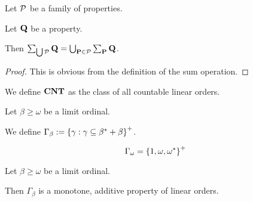 \begin{lemma}
  Let $\mathcal{P}$ be a family of properties.

  Let $\mathbf{Q}$ be a property.

  Then $\sum_{\bigcup \mathcal{P}}{\mathbf{Q}} = \bigcup_{\mathbf{P} \in \mathcal{P}}{\sum_{\mathbf{P}}{\mathbf{Q}}}$.
\end{lemma}

\begin{proof}
  This is obvious from the definition of the sum operation.
\end{proof}

\begin{definition}
  We define $\mathbf{CNT}$ as the class of all countable linear orders.
\end{definition}


\begin{definition}
  Let $\beta \ge \omega$ be a limit ordinal.

  We define $\Gamma_{\beta} := \left\{ {\gamma : \gamma \subseteq \beta^\ast + \beta} \right\}^+$.
\end{definition}

\begin{example}
  \[
    \Gamma_{\omega} = \left\{ {1, \omega, \omega^\ast} \right\}^+
  \]
\end{example}

\begin{observation}
  Let $\beta \ge \omega$ be a limit ordinal.

  Then $\Gamma_{\beta}$ is a monotone, additive property of linear orders.
\end{observation}